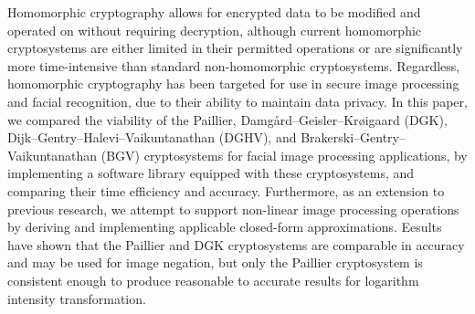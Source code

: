 \begin{thesisabstract}
    \noindent
    Homomorphic cryptography allows for encrypted data to be modified and operated on without requiring decryption, although current homomorphic cryptosystems are either limited in their permitted operations or are significantly more time-intensive than standard non-homomorphic cryptosystems. Regardless, homomorphic cryptography has been targeted for use in secure image processing and facial recognition, due to their ability to maintain data privacy. In this paper, we compared the viability of the Paillier, Damg{\aa}rd--Geisler--Kr{\o}igaard (DGK), Dijk--Gentry--Halevi--Vaikuntanathan (DGHV), and Brakerski--Gentry--Vaikuntanathan (BGV) cryptosystems for facial image processing applications, by implementing a software library equipped with these cryptosystems, and comparing their time efficiency and accuracy. Furthermore, as an extension to previous research, we attempt to support non-linear image processing operations by deriving and implementing applicable closed-form approximations. Eesults have shown that the Paillier and DGK cryptosystems are comparable in accuracy and may be used for image negation, but only the Paillier cryptosystem is consistent enough to produce reasonable to accurate results for logarithm intensity transformation.

\end{thesisabstract}
